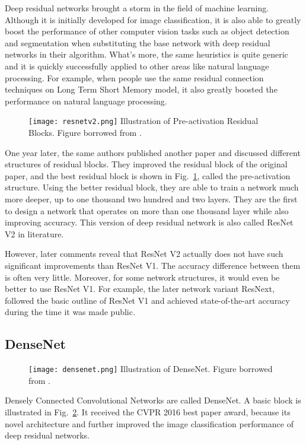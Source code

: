 Deep residual networks brought a storm in the field of machine learning. Although it is initially developed for image classification, it is also able to greatly boost the performance of other computer vision tasks such as object detection and segmentation when substituting the base network with deep residual networks in their algorithm. What's more, the same heuristics is quite generic and it is quickly successfully applied to other areas like natural language processing. For example, when people use the same residual connection techniques on Long Term Short Memory model, it also greatly boosted the performance on natural language processing.
\begin{figure}[!htp]
	\centering
	\texttt{[image: resnetv2.png]}
	{Illustration of Pre-activation Residual Blocks. Figure borrowed from \parencite{he2016identity}.}
	\label{fig:resnetv2}
\end{figure}
One year later, the same authors published another paper\cite{he2016identity} and discussed different structures of residual blocks. They improved the residual block of the original paper, and the best residual block is shown in Fig.~\ref{fig:resnetv2}, called the pre-activation structure. Using the better residual block, they are able to train a network much more deeper, up to one thousand two hundred and two layers. They are the first to design a network that operates on more than one thousand layer while also improving accuracy. This version of deep residual network is also called ResNet V2 in literature. 

However, later comments reveal that ResNet V2 actually does not have such significant improvements than ResNet V1. The accuracy difference between them is often very little. Moreover, for some network structures, it would even be better to use ResNet V1. For example, the later network variant ResNext, followed the basic outline of ResNet V1 and achieved state-of-the-art accuracy during the time it was made public.

\subsection{DenseNet}
\begin{figure}[!htp]
	\centering
	\texttt{[image: densenet.png]}
	{Illustration of DenseNet. Figure borrowed from \cite{huang2017densely}.}
	\label{fig:densenet}
\end{figure}
Densely Connected Convolutional Networks\cite{huang2017densely} are called DenseNet. A basic block is illustrated in Fig.~\ref{fig:densenet}. It received the CVPR 2016 best paper award, because its novel architecture and further improved the image classification performance of deep residual networks.


